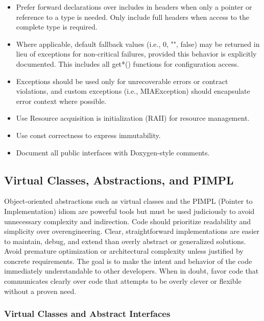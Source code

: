 \begin{itemize}
    \item Prefer forward declarations over includes in headers when only a pointer or reference to a type is needed. Only include full headers when access to the complete type is required.
    \item Where applicable, default fallback values (i.e., 0, "", false) may be returned in lieu of exceptions for non-critical failures, provided this behavior is explicitly documented. This includes all get*() functions for configuration access.
    \item Exceptions should be used only for unrecoverable errors or contract violations, and custom exceptions (i.e., MIAException) should encapsulate error context where possible.
    \item Use Resource acquisition is initialization (RAII) for resource management.
    \item Use const correctness to express immutability.
    \item Document all public interfaces with Doxygen-style comments.
\end{itemize}



\subsection{Virtual Classes, Abstractions, and PIMPL}

Object-oriented abstractions such as virtual classes and the PIMPL (Pointer to Implementation) idiom are powerful tools but must be used judiciously to avoid unnecessary complexity and indirection. Code should prioritize readability and simplicity over overengineering. Clear, straightforward implementations are easier to maintain, debug, and extend than overly abstract or generalized solutions. Avoid premature optimization or architectural complexity unless justified by concrete requirements. The goal is to make the intent and behavior of the code immediately understandable to other developers. When in doubt, favor code that communicates clearly over code that attempts to be overly clever or flexible without a proven need.

\subsubsection*{Virtual Classes and Abstract Interfaces}

